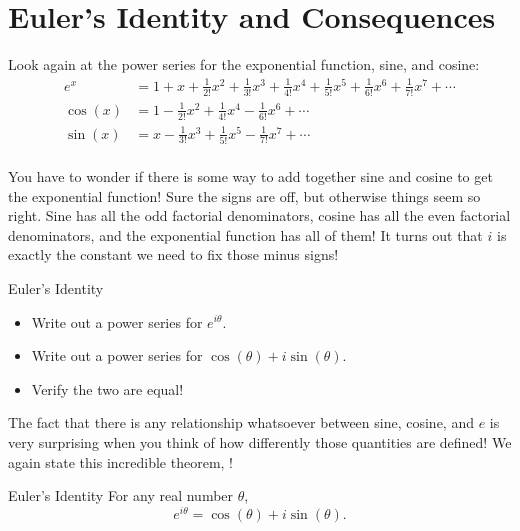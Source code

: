 \section{Euler's Identity and Consequences}

Look again at the power series for the exponential function, sine, and cosine: 
\begin{align*}
e^x&=1+x+\frac{1}{2!}x^2+\frac{1}{3!}x^3+\frac{1}{4!}x^4+\frac{1}{5!}x^5+\frac{1}{6!}x^6+\frac{1}{7!}x^7+\cdots\\
\cos(x)&=1-\frac{1}{2!}x^2+\frac{1}{4!}x^4-\frac{1}{6!}x^6+\cdots \\
\sin(x)&=x-\frac{1}{3!}x^3+\frac{1}{5!}x^5-\frac{1}{7!}x^7+\cdots \\
\end{align*}

You have to wonder if there is some way to add together sine and cosine to get the exponential function!  Sure the signs are off, but otherwise things seem so right.  Sine has all the odd factorial denominators, cosine has all the even factorial denominators, and the exponential function has all of them!  It turns out that $i$ is exactly the constant we need to fix those minus signs!

\begin{exercise}{ Euler's Identity \Coffeecup \Coffeecup}
\begin{itemize}
\item Write out a power series for $e^{i\theta}$. \vspace*{2in}
\item Write out a power series for $\cos(\theta)+i\sin(\theta)$.\vspace*{2in}
\item Verify the two are equal!
\vspace*{1in}
\end{itemize}
\end{exercise}

The fact that there is any relationship whatsoever between sine, cosine, and $e$ is very surprising when you think of how differently those quantities are defined!  We again state this incredible theorem, ! 

\begin{theorem}{Euler's Identity}
For any real number $\theta$, $$e^{i\theta}=\cos(\theta)+i\sin(\theta). $$
\end{theorem}

